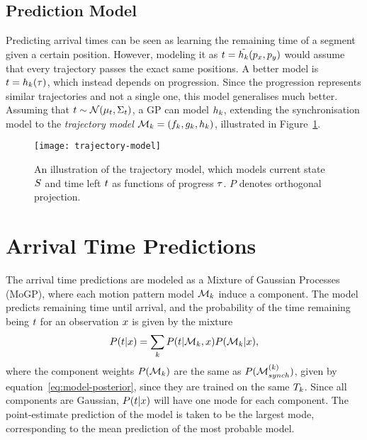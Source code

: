 \subsection{Prediction Model}
Predicting arrival times can be seen as learning the remaining time of
a segment given a certain position. However, modeling it as $t
= \tilde{h_{k}}(p_x, p_y)$ would assume that every trajectory passes the
exact same positions. A better model is $t
= h_{k}(\tau)$, which instead depends on progression. Since the
progression represents similar trajectories and not a single one, this
model generalises much better. Assuming that $t \sim
\mathcal{N}(\mu_{t}, \Sigma_{t})$, a GP can model $h_{k}$, 
extending the synchronisation model to the \textit{trajectory model}
$\mathcal{M}_{k} = (f_{k}, g_{k}, h_{k})$, illustrated in Figure~\ref{fig:trajectory-model}.
\begin{figure}
  \centering
  \texttt{[image: trajectory-model]}
  \caption{An illustration of the trajectory model, which models
    current state $S$ and time left $t$ as functions of
    progress $\tau$. $P$ denotes orthogonal projection.}\label{fig:trajectory-model}
\end{figure}

\section{Arrival Time Predictions}
The arrival time predictions are modeled as a Mixture of Gaussian
Processes (MoGP), where each motion pattern model $\mathcal{M}_{k}$ induce a component. The
model predicts remaining time until arrival, and the probability of
the time remaining being $t$ for an observation $x$ is given by
the mixture
\begin{equation}
  P(t \vert x) = \sum_{k}P(t \vert \mathcal{M}_{k}, x)
  P(\mathcal{M}_{k} \vert x),
\end{equation}
where the component weights $P(\mathcal{M}_{k})$ are the same as
$P(\mathcal{M}^{(k)}_{synch})$, given by equation~\ref{eq:model-posterior}, 
since they are trained on the same
$T_{k}$. Since all components are Gaussian, 
$P(t \vert x)$ will have one mode for each component. The
point-estimate prediction of the model is taken to be the largest
mode, corresponding to the mean prediction of the most probable model.

